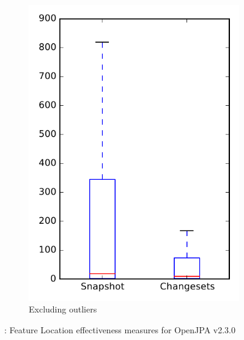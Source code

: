\begin{figure}
\begin{subfigure}{.4\textwidth}
        \includegraphics[height=0.4\textheight]{figures/flt/rq1_openjpa_no_outlier}
        \caption{Excluding outliers}\label{fig:flt:rq1:openjpa_no_outlier}
    \end{subfigure}
\caption{\fone: Feature Location effectiveness measures for OpenJPA v2.3.0}
\label{fig:flt:rq1:openjpa}
\end{figure}
